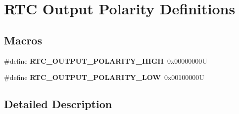 \hypertarget{group___r_t_c___output___polarity___definitions}{}\section{R\+TC Output Polarity Definitions}
\label{group___r_t_c___output___polarity___definitions}
\subsection*{Macros}
\begin{DoxyCompactItemize}
\item 
\mbox{\label{group___r_t_c___output___polarity___definitions_ga093c938e6067080b264878bc99a43dd5}} 
\#define {\bfseries R\+T\+C\+\_\+\+O\+U\+T\+P\+U\+T\+\_\+\+P\+O\+L\+A\+R\+I\+T\+Y\+\_\+\+H\+I\+GH}~0x00000000U
\item 
\mbox{\label{group___r_t_c___output___polarity___definitions_ga97a5745b07442aa338c2a3b81c93048b}} 
\#define {\bfseries R\+T\+C\+\_\+\+O\+U\+T\+P\+U\+T\+\_\+\+P\+O\+L\+A\+R\+I\+T\+Y\+\_\+\+L\+OW}~0x00100000U
\end{DoxyCompactItemize}


\subsection{Detailed Description}
